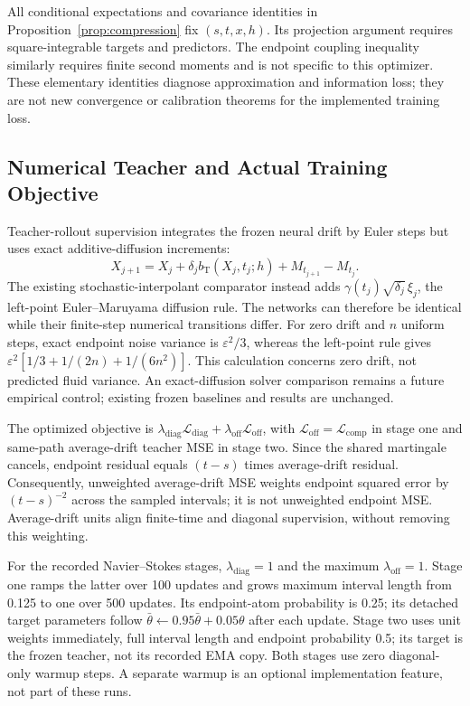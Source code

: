 All conditional expectations and covariance identities in Proposition~\ref{prop:compression} fix $(s,t,x,h)$. Its projection argument requires square-integrable targets and predictors. The endpoint coupling inequality similarly requires finite second moments and is not specific to this optimizer. These elementary identities diagnose approximation and information loss; they are not new convergence or calibration theorems for the implemented training loss.

\subsection{Numerical Teacher and Actual Training Objective}
\label{app:numerical-teacher}
Teacher-rollout supervision integrates the frozen neural drift by Euler steps but uses exact additive-diffusion increments:
\begin{equation}
X_{j+1}=X_j+\delta_j b_{\mathrm T}(X_j,t_j;h)
+M_{t_{j+1}}-M_{t_j}.
\label{eq:numerical-teacher}
\end{equation}
The existing stochastic-interpolant comparator instead adds $\gamma(t_j)\sqrt{\delta_j}\,\xi_j$, the left-point Euler--Maruyama diffusion rule. The networks can therefore be identical while their finite-step numerical transitions differ. For zero drift and $n$ uniform steps, exact endpoint noise variance is $\varepsilon^2/3$, whereas the left-point rule gives $\varepsilon^2[1/3+1/(2n)+1/(6n^2)]$. This calculation concerns zero drift, not predicted fluid variance. An exact-diffusion solver comparison remains a future empirical control; existing frozen baselines and results are unchanged.

The optimized objective is $\lambda_{\mathrm{diag}}\mathcal L_{\mathrm{diag}}+\lambda_{\mathrm{off}}\mathcal L_{\mathrm{off}}$, with $\mathcal L_{\mathrm{off}}=\mathcal L_{\mathrm{comp}}$ in stage one and same-path average-drift teacher MSE in stage two. Since the shared martingale cancels, endpoint residual equals $(t-s)$ times average-drift residual. Consequently, unweighted average-drift MSE weights endpoint squared error by $(t-s)^{-2}$ across the sampled intervals; it is not unweighted endpoint MSE. Average-drift units align finite-time and diagonal supervision, without removing this weighting.

For the recorded Navier--Stokes stages, $\lambda_{\mathrm{diag}}=1$ and the maximum $\lambda_{\mathrm{off}}=1$. Stage one ramps the latter over 100 updates and grows maximum interval length from 0.125 to one over 500 updates. Its endpoint-atom probability is 0.25; its detached target parameters follow $\bar\theta\leftarrow0.95\bar\theta+0.05\theta$ after each update. Stage two uses unit weights immediately, full interval length and endpoint probability 0.5; its target is the frozen teacher, not its recorded EMA copy. Both stages use zero diagonal-only warmup steps. A separate warmup is an optional implementation feature, not part of these runs.

